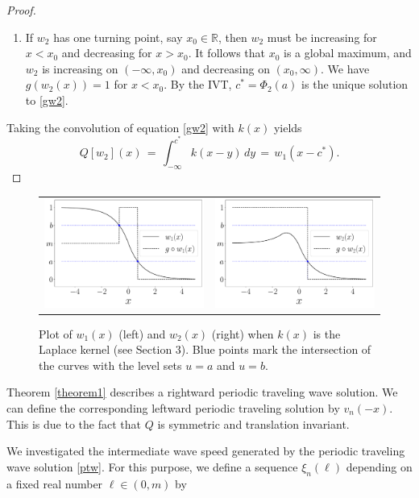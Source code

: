 \documentclass[11pt]{article}
\theoremstyle{definition}
\numberwithin{equation}{section}
\numberwithin{thm}{section}
\renewcommand{\a}{a}
\renewcommand{\b}{b}
\newcommand{\m}{m}
\begin{document}
\begin{proof}
\begin{enumerate}[{Case} 1.]
\item If $w_2$ has one turning point, say $x_0 \in \mathbb R$, then $w_2$ must be  increasing for $x<x_0$ and decreasing for $x>x_0$. It follows that $x_0$ is a global maximum, and $w_2$ is increasing on $(-\infty,x_0)$ and decreasing on $(x_0,\infty)$. We have $g(w_2(x))=1$ for $x<x_0$. By the IVT, $c^* = \Phi_2(\a)$ is the unique solution to \eqref{gw2}.
\end{enumerate}
Taking the convolution of equation \eqref{gw2} with $k(x)$ yields
$$
Q[w_2](x) \,=\, \int_{-\infty}^{c^*} k(x-y) \, dy \,=\, w_1(x-c^*).
$$
\end{proof}

\begin{figure}
\begin{tabular}{cc}
  \includegraphics[width=65mm]{figures/fig7a.pdf} &   \includegraphics[width=65mm]{figures/fig7b.pdf}
\end{tabular}
\caption{Plot of $w_1(x)$ (left) and $w_2(x)$ (right) when $k(x)$ is the Laplace kernel (see Section 3). Blue points mark the intersection of the curves with the level sets $u=\a$ and $u=\b$.}
\end{figure}

Theorem \ref{theorem1} describes a rightward periodic traveling wave solution. We can define the corresponding leftward periodic traveling solution by $v_n(-x)$. This is due to the fact that $Q$ is symmetric and translation invariant.

We investigated the intermediate wave speed generated by the periodic traveling wave solution \eqref{ptw}. For this purpose, we define a sequence $\xi_n(\ell)$ depending on a fixed real number $\ell \in (0,\m)$ by
\end{document}
